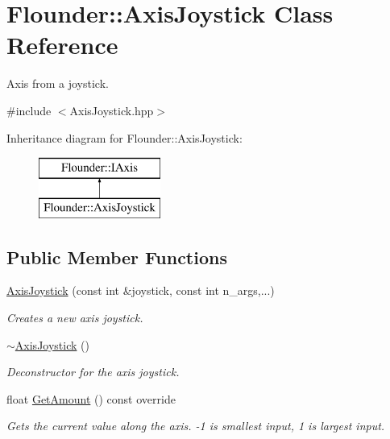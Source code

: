 \hypertarget{class_flounder_1_1_axis_joystick}{}\section{Flounder\+:\+:Axis\+Joystick Class Reference}
\label{class_flounder_1_1_axis_joystick}


Axis from a joystick.  




{\ttfamily \#include $<$Axis\+Joystick.\+hpp$>$}

Inheritance diagram for Flounder\+:\+:Axis\+Joystick\+:\begin{figure}[H]
\begin{center}
\leavevmode
\includegraphics[height=2.000000cm]{class_flounder_1_1_axis_joystick}
\end{center}
\end{figure}
\subsection*{Public Member Functions}
\begin{DoxyCompactItemize}
\item 
\hyperlink{class_flounder_1_1_axis_joystick_af9bb9c79c8f37c42aaec9e3f52094e46}{Axis\+Joystick} (const int \&joystick, const int n\+\_\+args,...)
\begin{DoxyCompactList}\small\item\em Creates a new axis joystick. \end{DoxyCompactList}\item 
\hyperlink{class_flounder_1_1_axis_joystick_af9ca5ae80fbcf3702db33380bc7d439e}{$\sim$\+Axis\+Joystick} ()
\begin{DoxyCompactList}\small\item\em Deconstructor for the axis joystick. \end{DoxyCompactList}\item 
float \hyperlink{class_flounder_1_1_axis_joystick_a0464d3a7f1749bd27260d7fe3a8078f6}{Get\+Amount} () const override
\begin{DoxyCompactList}\small\item\em Gets the current value along the axis. -\/1 is smallest input, 1 is largest input. \end{DoxyCompactList}\end{DoxyCompactItemize}
